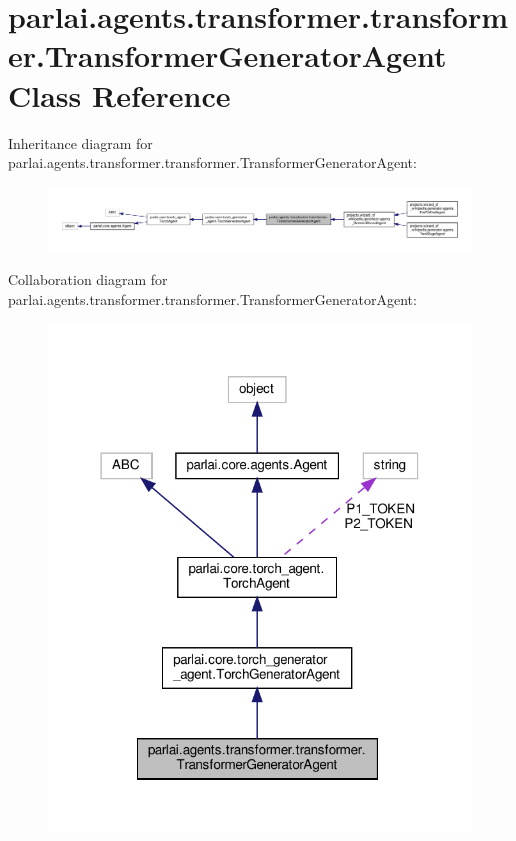\hypertarget{classparlai_1_1agents_1_1transformer_1_1transformer_1_1TransformerGeneratorAgent}{}\section{parlai.\+agents.\+transformer.\+transformer.\+Transformer\+Generator\+Agent Class Reference}
\label{classparlai_1_1agents_1_1transformer_1_1transformer_1_1TransformerGeneratorAgent}


Inheritance diagram for parlai.\+agents.\+transformer.\+transformer.\+Transformer\+Generator\+Agent\+:
\nopagebreak
\begin{figure}[H]
\begin{center}
\leavevmode
\includegraphics[width=350pt]{da/db6/classparlai_1_1agents_1_1transformer_1_1transformer_1_1TransformerGeneratorAgent__inherit__graph}
\end{center}
\end{figure}


Collaboration diagram for parlai.\+agents.\+transformer.\+transformer.\+Transformer\+Generator\+Agent\+:
\nopagebreak
\begin{figure}[H]
\begin{center}
\leavevmode
\includegraphics[width=318pt]{d9/d8e/classparlai_1_1agents_1_1transformer_1_1transformer_1_1TransformerGeneratorAgent__coll__graph}
\end{center}
\end{figure}
